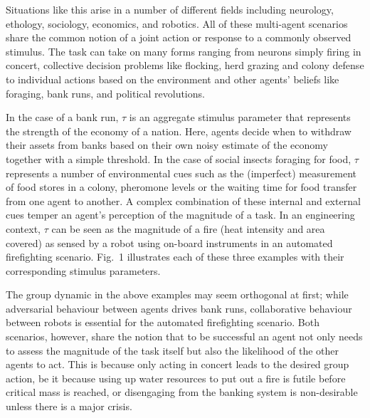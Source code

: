 \documentclass{nature}
\begin{document}
Situations like this arise in a number of different fields including neurology\cite{Yoshida2010, Suzuki2015}, ethology\cite{Robinson1987, Gordon1996, Bonabeau1998, Theraulaz1998}, sociology\cite{Raafat2009}, economics\cite{Morris2000}, and robotics\cite{Martinoli1999, Krieger2000, Kube2000, Pynadath2002, Gerkey2003, Mataric2003, Gerkey2004, Kanakia2014}. All of these multi-agent scenarios share the common notion of a joint action or response to a commonly observed stimulus. The task can take on many forms ranging from neurons simply firing in concert, collective decision problems like flocking, herd grazing and colony defense to individual actions based on the environment and other agents' beliefs like foraging, bank runs, and political revolutions. 

In the case of a bank run\cite{Morris2000}, $\tau$ is an aggregate stimulus parameter that represents the strength of the economy of a nation. Here, agents decide when to withdraw their assets from banks based on their own noisy estimate of the economy together with a simple threshold. In the case of social insects foraging for food\cite{Bonabeau1996, Theraulaz1998, Krieger2000}, $\tau$ represents a number of environmental cues such as the (imperfect) measurement of food stores in a colony, pheromone levels\cite{Robinson1987} or the waiting time for food transfer from one agent to another\cite{Seeley1989}.  A complex combination of these internal and external cues\cite{Gordon1996} temper an agent's perception of the magnitude of a task. In an engineering context, $\tau$ can be seen as the magnitude of a fire (heat intensity and area covered) as sensed by a robot using on-board instruments in an automated firefighting scenario\cite{Kanakia2014}. Fig.~1 illustrates each of these three examples with their corresponding stimulus parameters. 

The group dynamic in the above examples may seem orthogonal at first; while adversarial behaviour between agents drives bank runs, collaborative behaviour between robots is essential for the automated firefighting scenario. Both scenarios, however, share the notion that to be successful an agent not only needs to assess the magnitude of the task itself but also the likelihood of the other agents to act. This is because only acting in concert leads to the desired group action, be it because using up water resources to put out a fire is futile before critical mass is reached, or disengaging from the banking system is non-desirable unless there is a major crisis. 
\end{document}
